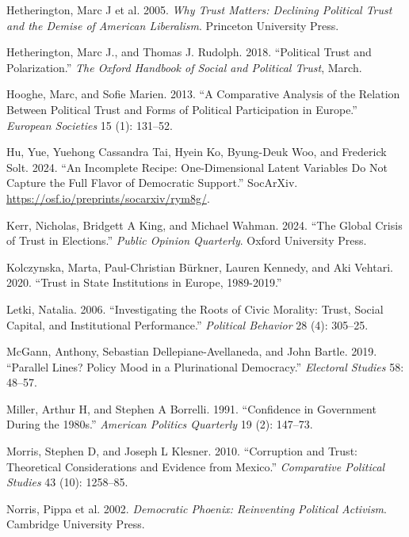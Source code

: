 \documentclass[
  12pt,
]{article}
\newlength{\cslhangindent}
\newenvironment{CSLReferences}[2] %
 {\begin{list}{}{%
  \setlength{\itemindent}{0pt}
  \setlength{\leftmargin}{0pt}
  \setlength{\parsep}{0pt}
  \ifodd #1
   \setlength{\leftmargin}{\cslhangindent}
   \setlength{\itemindent}{-1\cslhangindent}
  \fi
  \setlength{\itemsep}{#2\baselineskip}}}
 {\end{list}}
\begin{document}
\begin{CSLReferences}{1}{0}
Hetherington, Marc J et al. 2005. \emph{Why Trust Matters: Declining Political Trust and the Demise of American Liberalism}. Princeton University Press.

Hetherington, Marc J., and Thomas J. Rudolph. 2018. {``Political {Trust} and {Polarization}.''} \emph{The Oxford Handbook of Social and Political Trust}, March.

Hooghe, Marc, and Sofie Marien. 2013. {``A Comparative Analysis of the Relation Between Political Trust and Forms of Political Participation in Europe.''} \emph{European Societies} 15 (1): 131--52.

Hu, Yue, Yuehong Cassandra Tai, Hyein Ko, Byung-Deuk Woo, and Frederick Solt. 2024. {``An Incomplete Recipe: One-Dimensional Latent Variables Do Not Capture the Full Flavor of Democratic Support.''} SocArXiv. \url{https://osf.io/preprints/socarxiv/rym8g/}.

Kerr, Nicholas, Bridgett A King, and Michael Wahman. 2024. {``The Global Crisis of Trust in Elections.''} \emph{Public Opinion Quarterly}. Oxford University Press.

Kolczynska, Marta, Paul-Christian Bürkner, Lauren Kennedy, and Aki Vehtari. 2020. {``Trust in State Institutions in Europe, 1989-2019.''}

Letki, Natalia. 2006. {``Investigating the Roots of Civic Morality: Trust, Social Capital, and Institutional Performance.''} \emph{Political Behavior} 28 (4): 305--25.

McGann, Anthony, Sebastian Dellepiane-Avellaneda, and John Bartle. 2019. {``Parallel Lines? Policy Mood in a Plurinational Democracy.''} \emph{Electoral Studies} 58: 48--57.

Miller, Arthur H, and Stephen A Borrelli. 1991. {``Confidence in Government During the 1980s.''} \emph{American Politics Quarterly} 19 (2): 147--73.

Morris, Stephen D, and Joseph L Klesner. 2010. {``Corruption and Trust: Theoretical Considerations and Evidence from Mexico.''} \emph{Comparative Political Studies} 43 (10): 1258--85.

Norris, Pippa et al. 2002. \emph{Democratic Phoenix: Reinventing Political Activism}. Cambridge University Press.


\end{CSLReferences}
\end{document}
